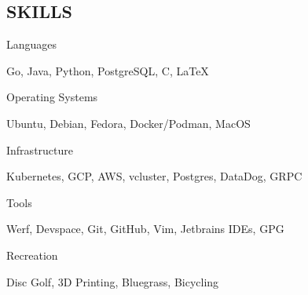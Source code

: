 \documentclass[line, margin, 10.5pt]{res}
\begin{document}
\begin{resume}
\section{\small SKILLS}
\begin{compactdesc}
\item[Languages] \hfill \begin{inparaenum} {Go, Java, Python, PostgreSQL, C, \LaTeX} \end{inparaenum}
    \item[Operating Systems] \hfill \begin{inparaenum} {Ubuntu, Debian, Fedora, Docker/Podman, MacOS} \end{inparaenum}
    \item[Infrastructure] \hfill \begin{inparaenum} {Kubernetes, GCP, AWS, vcluster, Postgres, DataDog, GRPC} \end{inparaenum}
    \item[Tools] \hfill \begin{inparaenum} {Werf, Devspace, Git, GitHub, Vim, Jetbrains IDEs, GPG} \end{inparaenum}
    \item[Recreation] \hfill \begin{inparaenum} {Disc Golf, 3D Printing, Bluegrass, Bicycling} \end{inparaenum}
\end{compactdesc}

\end{resume}
\end{document}
